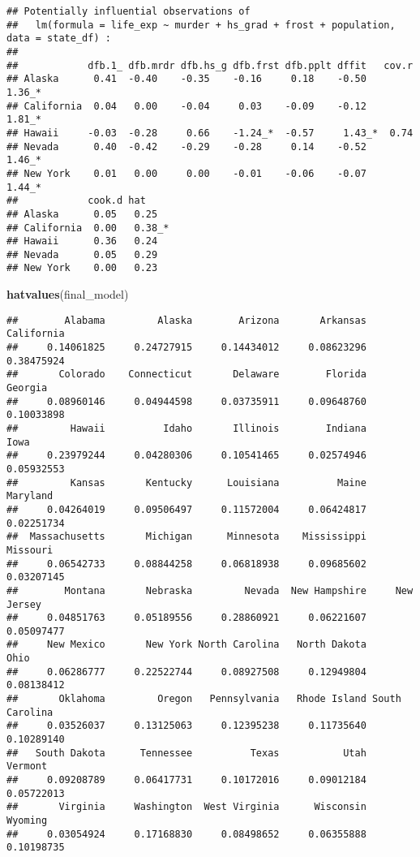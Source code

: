 \documentclass[]{article}
\newenvironment{Shaded}{\begin{snugshade}}{\end{snugshade}}
\newcommand{\KeywordTok}[1]{\textcolor[rgb]{0.13,0.29,0.53}{\textbf{#1}}}
\newcommand{\NormalTok}[1]{#1}
\begin{document}
\begin{verbatim}
## Potentially influential observations of
##   lm(formula = life_exp ~ murder + hs_grad + frost + population,      data = state_df) :
## 
##            dfb.1_ dfb.mrdr dfb.hs_g dfb.frst dfb.pplt dffit   cov.r  
## Alaska      0.41  -0.40    -0.35    -0.16     0.18    -0.50    1.36_*
## California  0.04   0.00    -0.04     0.03    -0.09    -0.12    1.81_*
## Hawaii     -0.03  -0.28     0.66    -1.24_*  -0.57     1.43_*  0.74  
## Nevada      0.40  -0.42    -0.29    -0.28     0.14    -0.52    1.46_*
## New York    0.01   0.00     0.00    -0.01    -0.06    -0.07    1.44_*
##            cook.d hat    
## Alaska      0.05   0.25  
## California  0.00   0.38_*
## Hawaii      0.36   0.24  
## Nevada      0.05   0.29  
## New York    0.00   0.23
\end{verbatim}

\begin{Shaded}
\begin{Highlighting}[]
\KeywordTok{hatvalues}\NormalTok{(final_model)}
\end{Highlighting}
\end{Shaded}

\begin{verbatim}
##        Alabama         Alaska        Arizona       Arkansas     California 
##     0.14061825     0.24727915     0.14434012     0.08623296     0.38475924 
##       Colorado    Connecticut       Delaware        Florida        Georgia 
##     0.08960146     0.04944598     0.03735911     0.09648760     0.10033898 
##         Hawaii          Idaho       Illinois        Indiana           Iowa 
##     0.23979244     0.04280306     0.10541465     0.02574946     0.05932553 
##         Kansas       Kentucky      Louisiana          Maine       Maryland 
##     0.04264019     0.09506497     0.11572004     0.06424817     0.02251734 
##  Massachusetts       Michigan      Minnesota    Mississippi       Missouri 
##     0.06542733     0.08844258     0.06818938     0.09685602     0.03207145 
##        Montana       Nebraska         Nevada  New Hampshire     New Jersey 
##     0.04851763     0.05189556     0.28860921     0.06221607     0.05097477 
##     New Mexico       New York North Carolina   North Dakota           Ohio 
##     0.06286777     0.22522744     0.08927508     0.12949804     0.08138412 
##       Oklahoma         Oregon   Pennsylvania   Rhode Island South Carolina 
##     0.03526037     0.13125063     0.12395238     0.11735640     0.10289140 
##   South Dakota      Tennessee          Texas           Utah        Vermont 
##     0.09208789     0.06417731     0.10172016     0.09012184     0.05722013 
##       Virginia     Washington  West Virginia      Wisconsin        Wyoming 
##     0.03054924     0.17168830     0.08498652     0.06355888     0.10198735
\end{verbatim}
\end{document}
